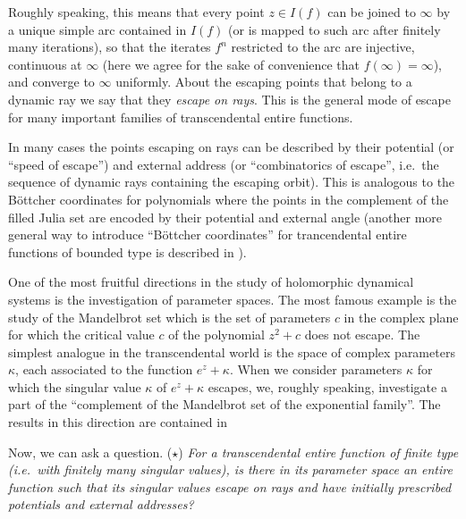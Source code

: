 \documentclass[10pt,reqno,a4paper]{amsart}
\numberwithin{figure}{section}
\numberwithin{equation}{section}
\begin{document}
Roughly speaking, this means that every point $z\in I(f)$ can be joined to $\infty$ by a unique simple arc contained in $I(f)$ (or is mapped to such arc after finitely many iterations), so that the iterates $f^n$ restricted to the arc are injective, continuous at $\infty$ (here we agree for the sake of convenience that $f(\infty)=\infty$), and converge to $\infty$ uniformly. About the escaping points that belong to a dynamic ray we say that they \emph{escape on rays}. This is the general mode of escape for many important families of transcendental entire functions.


In many cases the points escaping on rays can be described by their potential (or ``speed of escape'') and external address (or ``combinatorics of escape'', i.e.\ the sequence of dynamic rays containing the escaping orbit). This is analogous to the B\"ottcher coordinates for polynomials where the points in the complement of the filled Julia set are encoded by their potential and external angle (another more general way to introduce ``B\"ottcher coordinates'' for trancendental entire functions of bounded type is described in \cite{LasseParaSpace}).

One of the most fruitful directions in the study of holomorphic dynamical systems is the investigation of parameter spaces. The most famous example is the study of the Mandelbrot set which is the set of parameters $c$ in the complex plane for which the critical value $c$ of the polynomial $z^2+c$ does not escape. The simplest analogue in the transcendental world is the space of complex parameters $\kappa$, each associated to the function $e^z+\kappa$. When we consider parameters $\kappa$ for which the singular value $\kappa$ of $e^z+\kappa$ escapes, we, roughly speaking, investigate a part of the ``complement of the Mandelbrot set of the exponential family''. The results in this direction are contained in \cite{FRS,MarkusParaRays,MarkusThesis}

Now, we can ask a question. ($\star$) \emph{For a transcendental entire function of finite type (i.e.\ with finitely many singular values), is there in its parameter space an entire function such that its singular values escape on rays and have initially prescribed potentials and external addresses?}
\end{document}
